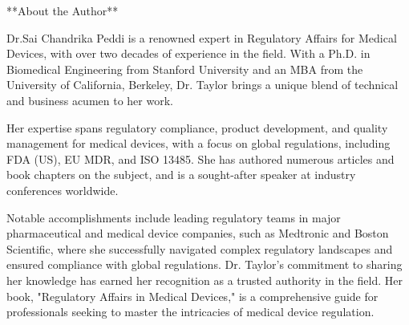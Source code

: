 **About the Author**

Dr.Sai Chandrika Peddi is a renowned expert in Regulatory Affairs for Medical Devices, with over two decades of experience in the field. With a Ph.D. in Biomedical Engineering from Stanford University and an MBA from the University of California, Berkeley, Dr. Taylor brings a unique blend of technical and business acumen to her work.

Her expertise spans regulatory compliance, product development, and quality management for medical devices, with a focus on global regulations, including FDA (US), EU MDR, and ISO 13485. She has authored numerous articles and book chapters on the subject, and is a sought-after speaker at industry conferences worldwide.

Notable accomplishments include leading regulatory teams in major pharmaceutical and medical device companies, such as Medtronic and Boston Scientific, where she successfully navigated complex regulatory landscapes and ensured compliance with global regulations. Dr. Taylor's commitment to sharing her knowledge has earned her recognition as a trusted authority in the field. Her book, "Regulatory Affairs in Medical Devices," is a comprehensive guide for professionals seeking to master the intricacies of medical device regulation.